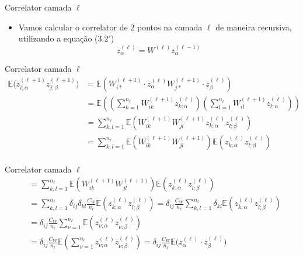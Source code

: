 \documentclass{beamer}
\newcommand{\EE}{\mathbb{E}}
\newcommand{\aaA}{\alpha}
\newcommand{\aaB}{\beta}
\begin{document}
\begin{frame}{Correlator camada $\ell$}
	\begin{itemize}
		\item Vamos calcular o correlator de 2 pontos na camada $\ell$ de maneira recursiva, utilizando a equação ($3.2'$)
		\begin{equation*}\tag{3.2'}
			z^{(\ell)}_{\alpha} = W^{(\ell)} z^{(\ell -1)}_\alpha
		\end{equation*}
	\end{itemize}
\end{frame}

\begin{frame}{Correlator camada $\ell$}
	\begin{align*}
		\EE\big(z^{(\ell +1)}_{i;\aaA} z^{(\ell +1)}_{j;\aaB}\big) &= 
		\EE\left(W^{(\ell+1)}_{i*}\cdot z^{(\ell)}_{\aaA}W^{(\ell+1)}_{j*}\cdot z^{(\ell)}_{\aaB} \right)  \\
		&=\EE\left( \left(\sum_{k=1}^{n_\ell} W^{(\ell +1)}_{ik}z^{(\ell)}_{k;\aaA}\right)
		\left(\sum_{l=1}^{n_\ell} W^{(\ell +1)}_{il}z^{(\ell)}_{l;\aaA}\right) \right)\\
		&=\sum_{k,l=1}^{n_\ell} \EE\left(W^{(\ell+1)}_{ik}W^{(\ell+1)}_{jl}z^{(\ell)}_{k;\aaA}z^{(\ell)}_{l;\aaB} \right)\\
		&=\sum_{k,l=1}^{n_\ell} \EE\left(W^{(\ell+1)}_{ik}W^{(\ell+1)}_{jl}\right) \EE\left(z^{(\ell)}_{k;\aaA}z^{(\ell)}_{l;\aaB} \right)\\
	\end{align*}
\end{frame}

\begin{frame}{Correlator camada $\ell$}
	\begin{align*}
		&=\sum_{k,l=1}^{n_\ell} \EE\left(W^{(\ell+1)}_{ik}W^{(\ell+1)}_{jl}\right) \EE\left(z^{(\ell)}_{k;\aaA}z^{(\ell)}_{l;\aaB} \right)\\
		&=\sum_{k,l=1}^{n_\ell} \delta_{ij}\delta_{kl}\frac{C_W}{n_\ell} \EE\left(z^{(\ell)}_{k;\aaA}z^{(\ell)}_{l;\aaB} \right) 
		=\delta_{ij}\frac{C_W}{n_\ell}\sum_{k,l=1}^{n_\ell} \delta_{kl} \EE\left(z^{(\ell)}_{k;\aaA}z^{(\ell)}_{l;\aaB} \right) \\
		&= \delta_{ij}\frac{C_W}{n_\ell} \sum_{\nu=1}^{n_\ell} \EE\left(z^{(\ell)}_{\nu;\aaA}z^{(\ell)}_{\nu;\aaB} \right) \\
		&= \delta_{ij}\frac{C_W}{n_\ell}\EE\left( \sum_{\nu=1}^{n_\ell}z^{(\ell)}_{\nu;\aaA}z^{(\ell)}_{\nu;\aaB} \right) 
		= \delta_{ij}\frac{C_W}{n_\ell} \EE\big(z^{(\ell)}_{\aaA}\cdot  z^{(\ell)}_{\aaB}\big)\tag{3.11}
	\end{align*}
\end{frame}
	 
\end{document}
